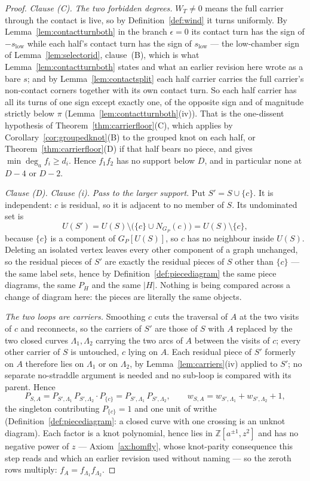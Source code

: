\begin{proof}
\emph{Clause (C).} \emph{The two forbidden degrees.} $W_T\neq0$ means the full carrier through
the contact is live, so by Definition~\ref{def:wind} it turns uniformly. By
Lemma~\ref{lem:contactturnboth} in the branch $\epsilon=0$ its contact turn has
the sign of $-s_{\mathrm{low}}$ while each half's contact turn has the sign of
$s_{\mathrm{low}}$ --- the low-chamber sign of Lemma~\ref{lem:selectorid}, clause~(B), which
is what Lemma~\ref{lem:contactturnboth} states and what an earlier revision here
wrote as a bare $s$; and by
Lemma~\ref{lem:contactsplit} each half carrier carries the full carrier's
non-contact corners together with its own contact turn. So each half carrier
has all its turns of one sign except exactly one, of the opposite sign and of
magnitude strictly below $\pi$ (Lemma~\ref{lem:contactturnboth}(iv)). That is the
one-dissent hypothesis of Theorem~\ref{thm:carrierfloor}(C), which applies by
Corollary~\ref{cor:groupedknot}(B) to the grouped knot on each half, or
Theorem~\ref{thm:carrierfloor}(D) if that half bears no piece, and gives
$\min\deg_af_i\geq d_i$. Hence $f_1f_2$ has no support below $D$, and in
particular none at $D-4$ or $D-2$.


\emph{Clause (D).} \emph{Clause (i).} \emph{Pass to the larger support.} Put $S'=S\cup\{c\}$. It is independent: $c$
is residual, so it is adjacent to no member of $S$. Its undominated set is
\[
   U(S')=U(S)\setminus\bigl(\{c\}\cup N_{G_P}(c)\bigr)=U(S)\setminus\{c\},
\]
because $\{c\}$ is a component of $G_P[U(S)]$, so $c$ has no neighbour inside
$U(S)$. Deleting an isolated vertex leaves every other component of a graph
unchanged, so the residual pieces of $S'$ are exactly the residual pieces of $S$
other than $\{c\}$ --- the same label sets, hence by
Definition~\ref{def:piecediagram} the same piece diagrams, the same $P_H$ and
the same $|H|$. Nothing is being compared across a change of diagram here: the
pieces are literally the same objects.

\emph{The two loops are carriers.} Smoothing $c$ cuts the traversal of $A$ at
the two visits of $c$ and reconnects, so the carriers of $S'$ are those of $S$
with $A$ replaced by the two closed curves $\Lambda_1,\Lambda_2$ carrying the
two arcs of $A$ between the visits of $c$; every other carrier of $S$ is
untouched, $c$ lying on $A$. Each residual piece of $S'$ formerly on $A$
therefore lies on $\Lambda_1$ or on $\Lambda_2$, by
Lemma~\ref{lem:carriers}(iv) applied to $S'$; no separate no-straddle
argument is needed and no sub-loop is compared with its parent. Hence
\[
   P_{S,A}=P_{S',\Lambda_1}\,P_{S',\Lambda_2}\cdot P_{\{c\}}
   =P_{S',\Lambda_1}\,P_{S',\Lambda_2},
   \qquad
   w_{S,A}=w_{S',\Lambda_1}+w_{S',\Lambda_2}+1,
\]
the singleton contributing $P_{\{c\}}=1$ and one unit of writhe
(Definition~\ref{def:piecediagram}: a closed curve with one crossing is an
unknot diagram). Each factor is a knot polynomial, hence lies in
$\mathbb Z[a^{\pm1},z^2]$ and has no negative power of $z$ ---
Axiom~\ref{ax:homfly}, whose knot-parity consequence this step reads and which
an earlier revision used without naming --- so the zeroth rows multiply:
$f_A=f_{\Lambda_1}f_{\Lambda_2}$.


\end{proof}
